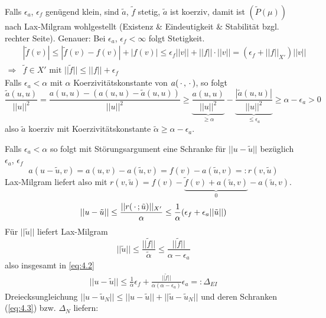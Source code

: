 \begin{bem}
Falls $\epsilon_a$, $\epsilon_f$ genügend klein, sind $\tilde{a}$, $\tilde{f}$ stetig, $\tilde{a}$ ist koerziv, damit ist $(\tilde{P}(\mu))$ nach Lax-Milgram wohlgestellt (Existenz \& Eindeutigkeit \& Stabilität bzgl. rechter Seite). Genauer: Bei $\epsilon_a$, $\epsilon_f < \infty$ folgt Stetigkeit.
\begin{align*}
 &|\tilde{f}(v)| \leq |\tilde{f}(v) - f(v) | + |f(v)| \leq \epsilon_f ||v|| + ||f|| \cdot ||v|| = (\epsilon_f + ||f||_{X'}) ||v|| \\
 \Rightarrow &\tilde{f} \in X' \text{ mit } ||\tilde{f}|| \leq ||f|| + \epsilon_f
\end{align*}
Falls $\epsilon_a < \alpha$ mit $\alpha$ Koerzivitätskonstante von $a(\,\cdot\,,\,\cdot\,)$, so folgt
\[
	\frac{\tilde{a}(u,u)}{||u||^2} = \frac{a(u,u)-(a(u,u) - \tilde{a}(u,u))}{||u||^2} \geq \underbrace{\frac{a(u,u)}{||u||^2}}_{\geq \alpha} - \underbrace{\frac{|\tilde{a}(u,u)|}{||u||^2}}_{\leq \epsilon_a} \geq \alpha - \epsilon_a > 0
\]
also $\tilde{a}$ koerziv mit Koerzivitätskonstante $\tilde{\alpha} \geq \alpha - \epsilon_a$.
\end{bem}

\begin{bem}
Falls $\epsilon_a < \alpha$ so folgt mit Störungsargument eine Schranke für $||u - \tilde{u}||$ bezüglich $\epsilon_a$, $\epsilon_f$
\[
	a(u - \tilde{u},v) = a(u,v) - a(\tilde{u},v) = f(v) - a(\tilde{u},v) =: r(v, \tilde{u})
\]
Lax-Milgram liefert also mit $r(v,\tilde{u}) = f(v) - \underbrace{\tilde{f}(v) + a(\tilde{u},v)}_{0} - a(\tilde{u},v)$.
\begin{align} \label{eq:4.2}
 || u- \tilde{u}|| \leq \frac{||r(\,\cdot\,;\tilde{u})||_{X'}}{\alpha} \leq \frac{1}{\alpha} (\epsilon_f + \epsilon_a ||\tilde{u}||)
\end{align}
Für $||\tilde{u}||$ liefert Lax-Milgram
\[
	||\tilde{u}|| \leq \frac{||\tilde{f}||}{\tilde{\alpha}} \leq \frac{||\tilde{f}||}{\alpha - \epsilon_a}
\]
also insgesamt in \ref{eq:4.2}
\begin{align} \label{eq:4.3}
	|| u - \tilde{u}|| \leq \frac{1}{\alpha} \epsilon_f + \frac{||\tilde{f}||}{\alpha(\alpha - \epsilon_a)} \epsilon_a =: \Delta_{EI}
\end{align}
Dreiecksungleichung $||u-\tilde{u}_N|| \leq || u - \tilde{u}|| + ||\tilde{u} - \tilde{u}_N||$ und deren Schranken (\ref{eq:4.3}) bzw. $\Delta_N$ liefern:
\end{bem}

